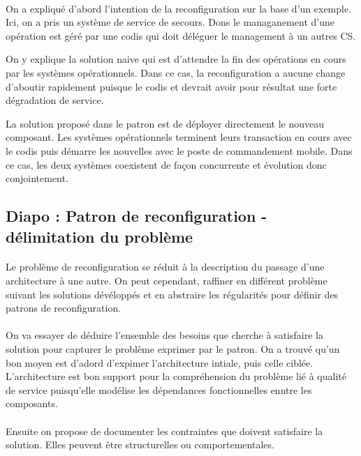 \paragraph{}
On a expliqué d'abord l'intention de la reconfiguration sur la base
d'un exemple. Ici, on a pris un système de service de secours. Dons
le managanement d'une opération est géré par une codis qui doit
déléguer le management à un autres CS. 

On y explique la solution naive qui est d'attendre la fin des
opérations en cours par les systèmes opérationnels. Dans ce cas, la
reconfiguration a aucune change d'aboutir rapidement puisque le codis
et devrait avoir pour résultat une forte dégradation de service. 

La solution proposé dans le patron est de déployer directement le
nouveau composant. Les systèmes opérationnels terminent leurs
transaction en cours avec le codis puis démarre les nouvelles avec le
poste de commandement mobile. Dans ce cas, les deux systèmes
coexistent de façon concurrente et évolution donc conjointement. 

\subsection{Diapo : Patron de reconfiguration - délimitation du problème}

\paragraph{}
Le problème de reconfiguration se réduit à la description du passage
d'une architecture à une autre. 
On peut cependant, raffiner en différent problème suivant les
solutions dévéloppés et en abstraire les régularités pour définir des
patrons de reconfiguration. 

\paragraph{}
On va essayer de déduire l'ensemble des besoins que cherche à
satisfaire la solution pour capturer le problème exprimer par le
patron. 
On a trouvé qu'un bon moyen est d'adord d'expimer l'architecture
intiale, puis celle ciblée. 
L'architecture est bon support pour la compréhension du problème lié à
qualité de service puisqu'elle modélise les dépendances fonctionnelles
enntre les composants. 

\paragraph{}
Ensuite on propose de documenter les contraintes que doivent satisfaire
la solution. Elles peuvent être structurelles ou comportementales.

